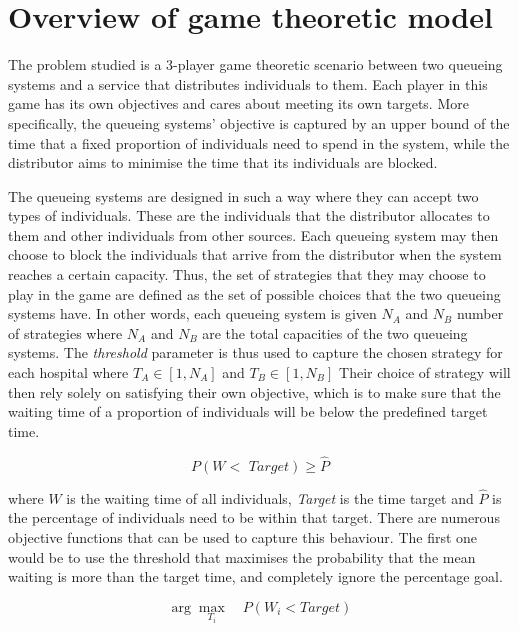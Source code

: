 \section{Overview of game theoretic model}

The problem studied is a 3-player game theoretic scenario between two queueing 
systems and a service that distributes individuals to them. 
Each player in this game has its own objectives and cares about meeting its own 
targets.
More specifically, the queueing systems' objective is captured by an upper bound
of the time that a fixed proportion of individuals need to spend in the system, 
while the distributor aims to minimise the time that its individuals 
are blocked.  

The queueing systems are designed in such a way where they can accept two types
of individuals. 
These are the individuals that the distributor allocates to them and 
other individuals from other sources. 
Each queueing system may then choose to block the individuals that arrive from 
the distributor when the system reaches a certain capacity. 
Thus, the set of strategies that they may choose to play in the game are defined 
as the set of possible choices that the two queueing systems have. 
In other words, each queueing system is given \( N_A \) and \( N_B \) number of 
strategies where \( N_A \) and \( N_B \) are the total capacities of the two 
queueing systems.
The \textit{threshold} parameter is thus used to capture the chosen 
strategy for each hospital where \( T_A \in \left[1, N_A \right] \) and 
\( T_B \in \left[1, N_B \right] \)
Their choice of strategy will then rely solely on satisfying their own 
objective, which is to make sure that the waiting time of a proportion of 
individuals will be below the predefined target time.

\begin{equation}
    P(W < \textit{ Target}) \geq \hat{P}
\end{equation}

where \(W\) is the waiting time of all individuals, \textit{Target} is the time 
target and \(\hat{P}\) is the percentage of individuals need to be within that 
target. 
There are numerous objective functions that can be used to capture this 
behaviour. 
The first one would be to use the threshold that maximises the probability that 
the mean waiting is more than the target time, and completely ignore the 
percentage goal.

\begin{equation}
    \arg \max_{T_i} \quad P(W_i < \textit{Target})
\end{equation}

